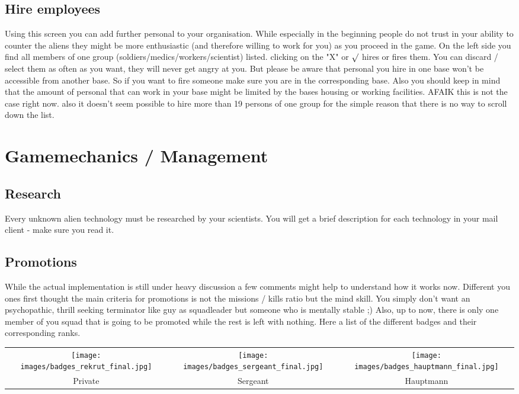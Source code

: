 \subsection{Hire employees}
Using this screen you can add further personal to your organisation. While especially in the beginning people do not trust in your ability to counter the aliens they might be more enthusiastic (and therefore willing to work for you) as you proceed in the game. On the left side you find all members of one group (soldiers/medics/workers/scientist) listed. clicking on the "X" or $\surd$ hires or fires them. You can discard / select them as often as you want, they will never get angry at you. But please be aware that personal you hire in one base won't be accessible from another base. So if you want to fire someone make sure you are in the corresponding base. Also you should keep in mind that the amount of personal that can work in your base might be limited by the bases housing or working facilities. AFAIK this is not the case right now. also it doesn't seem possible to hire more than 19 persons of one group for the simple reason that there is no way to scroll down the list.

\section{Gamemechanics / Management}
\subsection{Research}
Every unknown alien technology must be researched by your scientists. You will get a brief description for each technology in your mail client - make sure you read it.

\subsection{Promotions}
While the actual implementation is still under heavy discussion a few comments might help to understand how it works now. Different you ones first thought the main criteria for promotions is not the missions / kills ratio but the mind skill. You simply don't want an psychopathic, thrill seeking terminator like guy as squadleader but someone who is mentally stable ;) Also, up to now, there is only one member of you squad that is going to be promoted while the rest is left with nothing.
Here a list of the different badges and their corresponding ranks.

\begin{tabular}{ccc}
\texttt{[image: images/badges\_rekrut\_final.jpg]} & \texttt{[image: images/badges\_sergeant\_final.jpg]} & \texttt{[image: images/badges\_hauptmann\_final.jpg]}\\
Private & Sergeant & Hauptmann\\
\end{tabular} 
